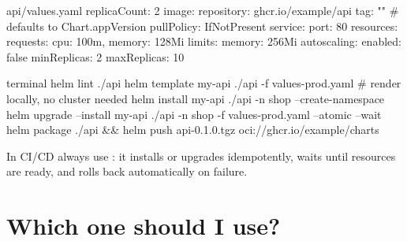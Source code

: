 \begin{yamlcode}{api/values.yaml}
replicaCount: 2
image:
  repository: ghcr.io/example/api
  tag: ""                  # defaults to Chart.appVersion
  pullPolicy: IfNotPresent
service:
  port: 80
resources:
  requests: { cpu: 100m, memory: 128Mi }
  limits:   { memory: 256Mi }
autoscaling:
  enabled: false
  minReplicas: 2
  maxReplicas: 10
\end{yamlcode}


\begin{bashcode}{terminal}
helm lint ./api
helm template my-api ./api -f values-prod.yaml      # render locally, no cluster needed
helm install my-api ./api -n shop --create-namespace
helm upgrade --install my-api ./api -n shop -f values-prod.yaml --atomic --wait
helm package ./api && helm push api-0.1.0.tgz oci://ghcr.io/example/charts
\end{bashcode}

\begin{protip}
In CI/CD always use : it installs or
upgrades idempotently, waits until resources are ready, and rolls back
automatically on failure.
\end{protip}

\section{Which one should I use?}

